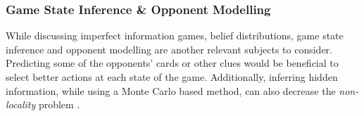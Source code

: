 \begin{table}[h]
\caption{Advantages and disadvantages of the mentioned Monte Carlo algorithms}
\label{tab:algorithms}
\end{table}



\subsubsection{Game State Inference \& Opponent Modelling}


While discussing imperfect information games, belief distributions, game state inference and opponent modelling are another relevant subjects to consider.
Predicting some of the opponents' cards or other clues would be beneficial to select better actions at each state of the game. Additionally, inferring hidden information, while using a Monte Carlo based method, can also decrease the \emph{non-locality} problem \cite{Cowling2012}.


